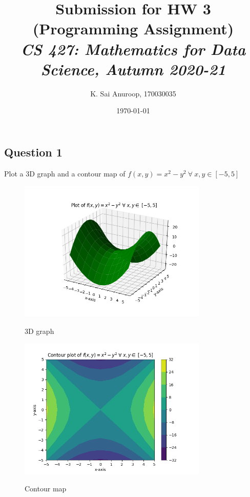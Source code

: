 \documentclass{article}
\title{Submission for HW 3 (Programming Assignment)\\\small{\textit{CS 427: Mathematics for Data Science, Autumn 2020-21}}}
\author{K. Sai Anuroop, 170030035}
\date{\today}
\begin{document}
\maketitle

\begin{flushleft}
\section{Question 1}
Plot a 3D graph and a contour map of $f(x,y)=x^2-y^2\ \forall\ x,y\in[-5,5]$
\begin{figure}[htp]
        \centering
        \includegraphics[width=9cm]{x2y2_saddle_surface.png}\\
        \caption{3D graph}
\end{figure}
\begin{figure}[htp]
        \centering
        \includegraphics[width=9cm]{x2y2_saddle_contour.png}\\
        \caption{Contour map}
\end{figure}
\clearpage

\end{flushleft}
\end{document}
